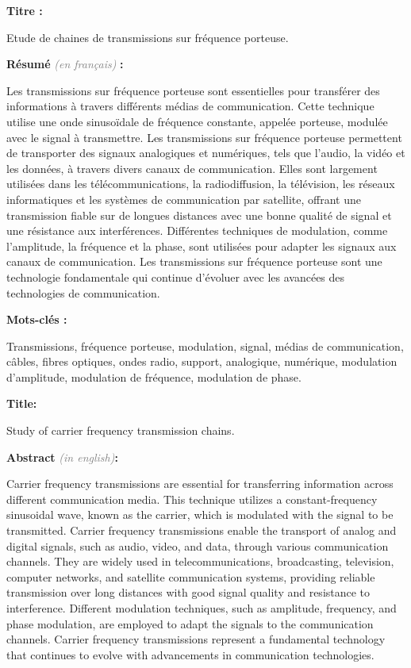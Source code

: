 \documentclass[11pt]{article}
\newcommand{\Gray}[1]{\textcolor{gray}{\textit{#1}}}
\begin{document}
{\bfseries Titre :}

Etude de chaines de transmissions sur fréquence porteuse.

{\bfseries Résumé} \Gray{(en français)} {\bfseries :}

Les transmissions sur fréquence porteuse sont essentielles pour transférer des informations à travers différents médias de communication. Cette technique utilise une onde sinusoïdale de fréquence constante, appelée porteuse, modulée avec le signal à transmettre. Les transmissions sur fréquence porteuse permettent de transporter des signaux analogiques et numériques, tels que l'audio, la vidéo et les données, à travers divers canaux de communication. Elles sont largement utilisées dans les télécommunications, la radiodiffusion, la télévision, les réseaux informatiques et les systèmes de communication par satellite, offrant une transmission fiable sur de longues distances avec une bonne qualité de signal et une résistance aux interférences. Différentes techniques de modulation, comme l'amplitude, la fréquence et la phase, sont utilisées pour adapter les signaux aux canaux de communication. Les transmissions sur fréquence porteuse sont une technologie fondamentale qui continue d'évoluer avec les avancées des technologies de communication.

{\bfseries Mots-clés :}

Transmissions, fréquence porteuse, modulation, signal, médias de communication, câbles, fibres optiques, ondes radio, support, analogique, numérique, modulation d'amplitude, modulation de fréquence, modulation de phase.

\vspace*{3mm}
\hrulefill
\vspace*{3mm}


{\bfseries Title:}

Study of carrier frequency transmission chains.

{\bfseries Abstract} \Gray{(in english)}{\bfseries:}

Carrier frequency transmissions are essential for transferring information across different communication media. This technique utilizes a constant-frequency sinusoidal wave, known as the carrier, which is modulated with the signal to be transmitted. Carrier frequency transmissions enable the transport of analog and digital signals, such as audio, video, and data, through various communication channels. They are widely used in telecommunications, broadcasting, television, computer networks, and satellite communication systems, providing reliable transmission over long distances with good signal quality and resistance to interference. Different modulation techniques, such as amplitude, frequency, and phase modulation, are employed to adapt the signals to the communication channels. Carrier frequency transmissions represent a fundamental technology that continues to evolve with advancements in communication technologies.
\end{document}
